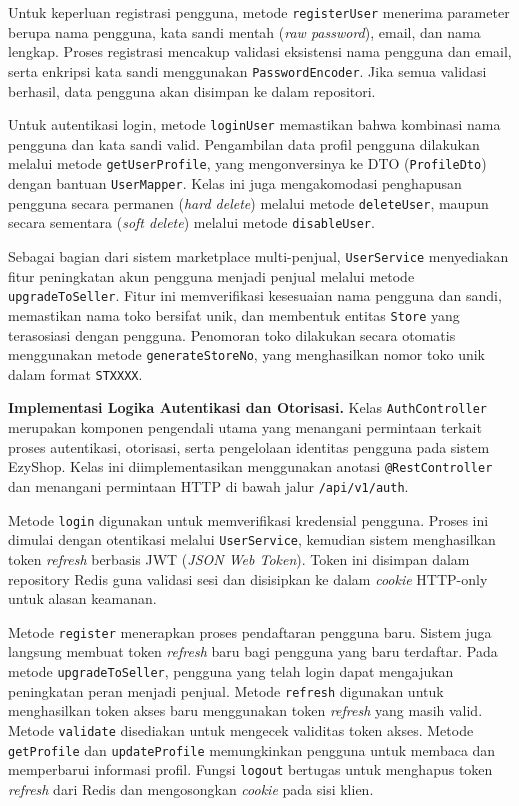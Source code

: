\documentclass[12pt,a4paper,twocolumn]{article}
\begin{document}
Untuk keperluan registrasi pengguna, metode \texttt{registerUser} menerima parameter berupa nama pengguna, kata sandi mentah (\textit{raw password}), email, dan nama lengkap. Proses registrasi mencakup validasi eksistensi nama pengguna dan email, serta enkripsi kata sandi menggunakan \texttt{PasswordEncoder}. Jika semua validasi berhasil, data pengguna akan disimpan ke dalam repositori.

Untuk autentikasi login, metode \texttt{loginUser} memastikan bahwa kombinasi nama pengguna dan kata sandi valid. Pengambilan data profil pengguna dilakukan melalui metode \texttt{getUserProfile}, yang mengonversinya ke DTO (\texttt{ProfileDto}) dengan bantuan \texttt{UserMapper}. Kelas ini juga mengakomodasi penghapusan pengguna secara permanen (\textit{hard delete}) melalui metode \texttt{deleteUser}, maupun secara sementara (\textit{soft delete}) melalui metode \texttt{disableUser}.

Sebagai bagian dari sistem marketplace multi-penjual, \texttt{UserService} menyediakan fitur peningkatan akun pengguna menjadi penjual melalui metode \texttt{upgradeToSeller}. Fitur ini memverifikasi kesesuaian nama pengguna dan sandi, memastikan nama toko bersifat unik, dan membentuk entitas \texttt{Store} yang terasosiasi dengan pengguna. Penomoran toko dilakukan secara otomatis menggunakan metode \texttt{generateStoreNo}, yang menghasilkan nomor toko unik dalam format \texttt{STXXXX}.

\textbf{Implementasi Logika Autentikasi dan Otorisasi.} Kelas \texttt{AuthController} merupakan komponen pengendali utama yang menangani permintaan terkait proses autentikasi, otorisasi, serta pengelolaan identitas pengguna pada sistem EzyShop. Kelas ini diimplementasikan menggunakan anotasi \texttt{@RestController} dan menangani permintaan HTTP di bawah jalur \texttt{/api/v1/auth}.

Metode \texttt{login} digunakan untuk memverifikasi kredensial pengguna. Proses ini dimulai dengan otentikasi melalui \texttt{UserService}, kemudian sistem menghasilkan token \textit{refresh} berbasis JWT (\textit{JSON Web Token}). Token ini disimpan dalam repository Redis guna validasi sesi dan disisipkan ke dalam \textit{cookie} HTTP-only untuk alasan keamanan.

Metode \texttt{register} menerapkan proses pendaftaran pengguna baru. Sistem juga langsung membuat token \textit{refresh} baru bagi pengguna yang baru terdaftar. Pada metode \texttt{upgradeToSeller}, pengguna yang telah login dapat mengajukan peningkatan peran menjadi penjual. Metode \texttt{refresh} digunakan untuk menghasilkan token akses baru menggunakan token \textit{refresh} yang masih valid. Metode \texttt{validate} disediakan untuk mengecek validitas token akses. Metode \texttt{getProfile} dan \texttt{updateProfile} memungkinkan pengguna untuk membaca dan memperbarui informasi profil. Fungsi \texttt{logout} bertugas untuk menghapus token \textit{refresh} dari Redis dan mengosongkan \textit{cookie} pada sisi klien.
\end{document}
